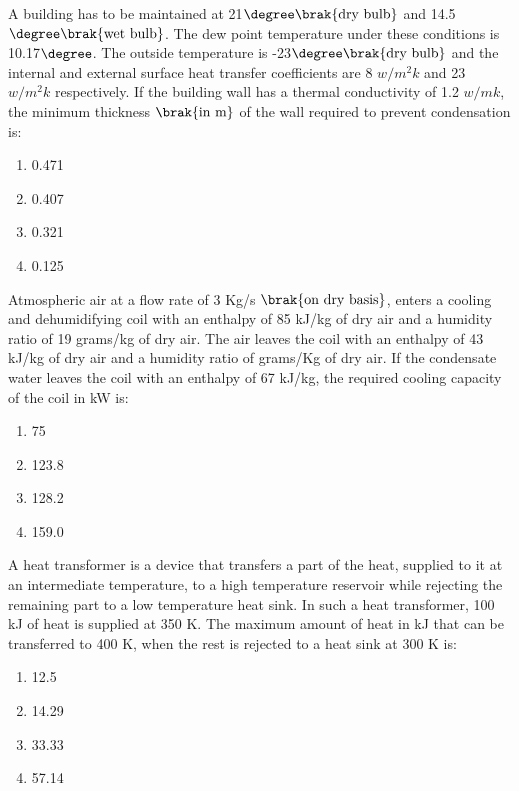 \iffalse
\title{Assignment}
\author{EE24BTECH11038}
\section{me}
\chapter{2007}
\fi
\item A building has to be maintained at 21$\degree\brak{\text{dry bulb}}$ and 14.5$\degree \brak{\text{wet bulb}}$. The dew point temperature under these conditions is 10.17$\degree$. The outside temperature is -23$\degree\brak{\text{dry bulb}}$ and the internal and external surface heat transfer coefficients are 8 $w/m^2k$ and 23 $w/m^2k$ respectively. If the building wall has a thermal conductivity of 1.2 $w/mk$, the minimum thickness $\brak{\text {in m}}$ of the wall required to prevent condensation is:
\begin{enumerate}
    \item 0.471
    \item 0.407
    \item 0.321
    \item 0.125
\end{enumerate}
\bigskip
\item Atmospheric air at a flow rate of 3 Kg/s $\brak{\text{on dry basis}}$, enters a cooling and dehumidifying coil with an enthalpy of 85 kJ/kg of dry air and a humidity ratio of 19 grams/kg of dry air. The air leaves the coil with an enthalpy of 43 kJ/kg of dry air and a humidity ratio of  grams/Kg of dry air. If the condensate water leaves the coil with an enthalpy of 67 kJ/kg, the required cooling capacity of the coil in kW is:
\begin{enumerate}
    \item 75
    \item 123.8
    \item 128.2
    \item 159.0
\end{enumerate}
\bigskip
\item A heat transformer is a device that transfers a part of the heat, supplied to it at an intermediate temperature, to a high temperature reservoir while rejecting the remaining part to a low temperature heat sink. In such a heat transformer, 100 kJ of heat is supplied at 350 K. The maximum amount of heat in kJ that can be transferred to 400 K, when the rest is rejected to a heat sink at 300 K is:
\begin{enumerate}
    \item 12.5
    \item 14.29
    \item 33.33
    \item 57.14
\end{enumerate}
